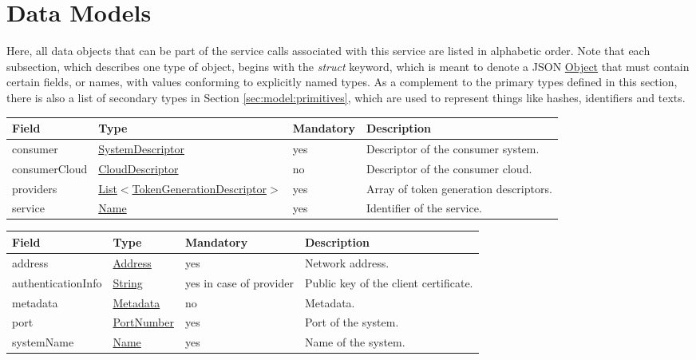 \documentclass[a4paper]{arrowhead}
\newcommand{\pref}[1]{{\textcolor{ArrowheadGrey}{\hyperref[sec:model:primitives:#1]{#1}}}}
\begin{document}
\newpage

\section{Data Models}
\label{sec:model}

Here, all data objects that can be part of the service calls associated with this service are listed in alphabetic order.
Note that each subsection, which describes one type of object, begins with the \textit{struct} keyword, which is meant to denote a JSON \pref{Object} that must contain certain fields, or names, with values conforming to explicitly named types.
As a complement to the primary types defined in this section, there is also a list of secondary types in Section \ref{sec:model:primitives}, which are used to represent things like hashes, identifiers and texts.

\label{sec:model:TokenGenerationRequest}
 
\begin{table}[ht!]
\begin{tabularx}{\textwidth}{| p{3cm} | p{6cm} | p{2cm} | X |} \hline
\rowcolor{gray!33} Field & Type & Mandatory & Description \\ \hline
consumer & \hyperref[sec:model:SystemDescriptor]{SystemDescriptor} & yes & Descriptor of the consumer system. \\ \hline
consumerCloud & \hyperref[sec:model:CloudDescriptor]{CloudDescriptor} & no &  Descriptor of the consumer cloud. \\ \hline
providers &  \pref{List}$<$\hyperref[sec:model:TokenGenerationDescriptor]{TokenGenerationDescriptor}$>$ & yes & Array of token generation descriptors. \\ \hline
service &\pref{Name} & yes & Identifier of the service. \\ \hline
\end{tabularx}
\end{table}

\label{sec:model:SystemDescriptor}

\begin{table}[ht!]
\begin{tabularx}{\textwidth}{| p{3cm} | p{3cm} | p{2cm} | X |} \hline
\rowcolor{gray!33} Field & Type & Mandatory & Description \\ \hline
address & \pref{Address} & yes & Network address. \\ \hline
authenticationInfo & \pref{String} & yes in case of provider & Public key of the client certificate. \\ \hline
metadata & \hyperref[sec:model:Metadata]{Metadata} & no & Metadata. \\ \hline
port & \pref{PortNumber} & yes & Port of the system. \\ \hline
systemName &\pref{Name} & yes & Name of the system. \\ \hline
\end{tabularx}
\end{table}
\end{document}
